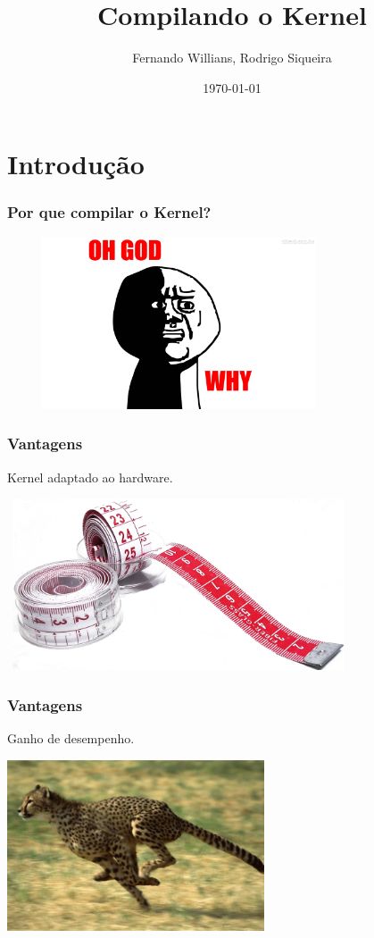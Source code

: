 \documentclass{beamer}
\title{Compilando o Kernel}
\author{Fernando Willians, Rodrigo Siqueira}
\date{\today}
\institute{\textbf{Universidade de Brasília - Faculdade do Gama}}
\begin{document}
\begin{frame}
  \titlepage
\end{frame}
  
\section{Introdução}
\begin{frame}
  \frametitle{Por que compilar o Kernel?}
  \begin{center}
    \includegraphics[height = 2in, width = 4in]{images/why.jpg}
  \end{center}
\end{frame}

\begin{frame}
  \frametitle{Vantagens}
   Kernel adaptado ao hardware.\\
   \begin{center}
    \includegraphics[height = 2in, width = 4in]{images/fit.jpeg}
   \end{center}
\end{frame}

\begin{frame}
  \frametitle{Vantagens}
   Ganho de desempenho.\\
   \begin{center}
    \includegraphics[height = 2in, width = 3in]{images/fast.jpeg}
   \end{center}
\end{frame}
\end{document}
